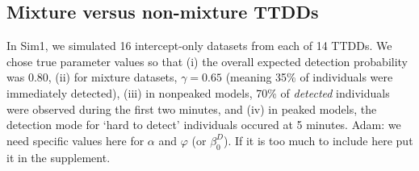 \documentclass[useAMS,usenatbib,referee,12pt]{article}
\newcommand{\jarad}[1]{{\color{Orange} #1}}
\begin{document}
% 






\subsection{Mixture versus non-mixture TTDDs}\label{sec:mixture}

In Sim1, we simulated 16 intercept-only datasets from each of 14 TTDDs. 
We chose true parameter values so that (i) the overall expected detection probability was 0.80, (ii) for mixture datasets, $\gamma = 0.65$ (meaning 35\% of individuals were immediately detected), (iii) in nonpeaked models, 70\% of \textit{detected} individuals were observed during the first two minutes, and (iv) in peaked models, the detection mode for `hard to detect' individuals occured at 5 minutes.
\jarad{Adam: we need specific values here for $\alpha$ and $\varphi$ (or $\beta_0^D$). If it is too much to include here put it in the supplement.}
\end{document}
